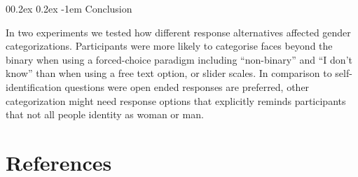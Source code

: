 \documentclass[
  man]{apa7}
\makeatletter
\let\oldparagraph\paragraph
\renewcommand{\paragraph}[1]{\oldparagraph{#1}\mbox{}}
\renewcommand{\paragraph}{\@startsection{paragraph}{4}{\parindent}%
  {0\baselineskip \@plus 0.2ex \@minus 0.2ex}%
  {-1em}%
  {\normalfont\normalsize\bfseries\itshape\typesectitle}}
\renewcommand{\paragraph}{\@startsection{paragraph}{4}{\parindent}%
  {0\baselineskip \@plus 0.2ex \@minus 0.2ex}%
  {-1em}%
  {\normalfont\normalsize\bfseries\typesectitle}}
\makeatother
\begin{document}
\hypertarget{conclusion}{%
\paragraph{Conclusion}\label{conclusion}}

In two experiments we tested how different response alternatives affected gender categorizations. Participants were more likely to categorise faces beyond the binary when using a forced-choice paradigm including ``non-binary'' and ``I don't know'' than when using a free text option, or slider scales. In comparison to self-identification questions were open ended responses are preferred, other categorization might need response options that explicitly reminds participants that not all people identity as woman or man.

\newpage

\hypertarget{references}{%
\section{References}\label{references}}
\end{document}

